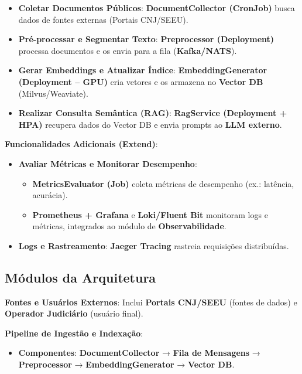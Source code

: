 \begin{description}
    \begin{itemize}
        \item \textbf{Coletar Documentos Públicos}:
\textbf{DocumentCollector (CronJob)} busca dados de fontes externas (Portais CNJ/SEEU).

        \item \textbf{Pré-processar e Segmentar Texto}:
\textbf{Preprocessor (Deployment)} processa documentos e os envia para a fila (\textbf{Kafka/NATS}).

        \item \textbf{Gerar Embeddings e Atualizar Índice}:
\textbf{EmbeddingGenerator (Deployment – GPU)} cria vetores e os armazena no \textbf{Vector DB} (Milvus/Weaviate).

        \item \textbf{Realizar Consulta Semântica (RAG)}:
\textbf{RagService (Deployment + HPA)} recupera dados do Vector DB e envia prompts ao \textbf{LLM externo}.

    \end{itemize}

    \item \textbf{Funcionalidades Adicionais (Extend)}:
    \begin{itemize}
        \item \textbf{Avaliar Métricas e Monitorar Desempenho}:
        \begin{itemize}
            \item \textbf{MetricsEvaluator (Job)} coleta métricas de desempenho (ex.: latência, acurácia).
            \item \textbf{Prometheus + Grafana} e \textbf{Loki/Fluent Bit} monitoram logs e métricas, integrados ao módulo de \textbf{Observabilidade}.
        \end{itemize}
        \item \textbf{Logs e Rastreamento}:
\textbf{Jaeger Tracing} rastreia requisições distribuídas.

    \end{itemize}

\subsection{Módulos da Arquitetura}

\textbf{Fontes e Usuários Externos}:
Inclui \textbf{Portais CNJ/SEEU} (fontes de dados) e \textbf{Operador Judiciário} (usuário final).


\textbf{Pipeline de Ingestão e Indexação}:
    \begin{itemize}
        \item \textbf{Componentes}:
\textbf{DocumentCollector} → \textbf{Fila de Mensagens} → \textbf{Preprocessor} → \textbf{EmbeddingGenerator} → \textbf{Vector DB}.


\end{itemize}
\end{description}
